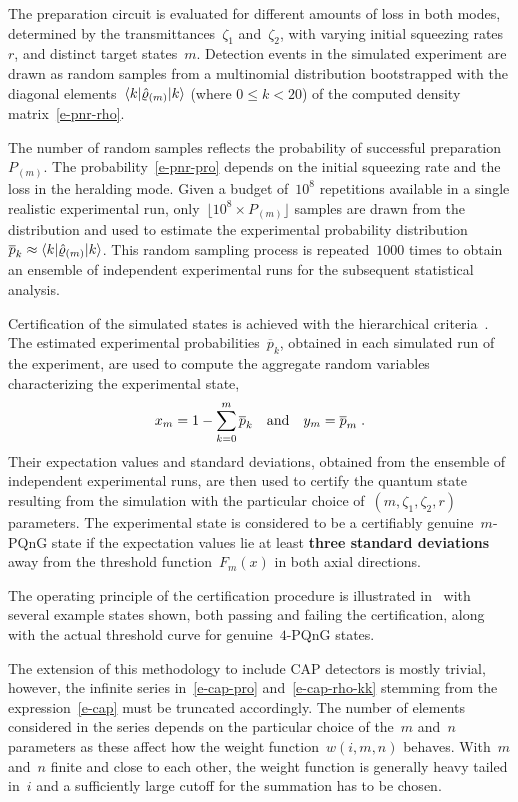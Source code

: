\documentclass{article}
\begin{document}
The preparation circuit is evaluated for different amounts of loss in both modes, determined by the transmittances~$\zeta_{1}$ and~$\zeta_{2}$, with varying initial squeezing rates~$r$, and distinct target states~${m}$. Detection events in the simulated experiment are drawn as random samples from a multinomial distribution bootstrapped with the diagonal elements~$\braket{k|\hat{\varrho}_{(m)}|k}$ (where ${0 \leq k < 20}$) of the computed density matrix~\eqref{e-pnr-rho}. 

The number of random samples reflects the probability of successful preparation $P_{(m)}$. The probability~\eqref{e-pnr-pro} depends on the initial squeezing rate and the loss in the heralding mode. Given a budget of~$10^{8}$ repetitions available in a single realistic experimental run, only~${\lfloor 10^{8} \times P_{(m)} \rfloor}$ samples are drawn from the distribution and used to estimate the experimental probability distribution~${\overline{p}_{k} \approx \braket{k|\hat{\varrho}_{(m)}|k}}$. This random sampling process is repeated~$1000$ times to obtain an ensemble of independent experimental runs for the subsequent statistical analysis.

Certification of the simulated states is achieved with the hierarchical criteria~\cite{lachman2019}. The estimated experimental probabilities~$\overline{p}_{k}$, obtained in each simulated run of the experiment, are used to compute the aggregate random variables characterizing the experimental state,
%
\begin{equation}
  x_{m} = 1 - \sum_{k = 0}^{m} \overline{p}_{k} 
  \quad\text{and}\quad
  y_{m} = \overline{p}_{m} 
  \;\text{.}
\end{equation}
%
Their expectation values and standard deviations, obtained from the ensemble of independent experimental runs, are then used to certify the quantum state resulting from the simulation with the particular choice of~${(m, \zeta_{1}, \zeta_{2}, r)}$ parameters. The experimental state is considered to be a certifiably genuine~$m$-PQnG state if the expectation values lie at least \textbf{three standard deviations} away from the threshold function~$F_{m} (x)$ in both axial directions.

The operating principle of the certification procedure is illustrated in~ with several example states shown, both passing and failing the certification, along with the actual threshold curve for genuine~$4$-PQnG states.

The extension of this methodology to include CAP detectors is mostly trivial, however, the infinite series in~\eqref{e-cap-pro} and~\eqref{e-cap-rho-kk} stemming from the expression~\eqref{e-cap} must be truncated accordingly. The number of elements considered in the series depends on the particular choice of the~$m$ and~$n$ parameters as these affect how the weight function~${w(i, m, n)}$ behaves. With~$m$ and~$n$ finite and close to each other, the weight function is generally heavy tailed in~$i$ and a sufficiently large cutoff for the summation has to be chosen.
\end{document}
